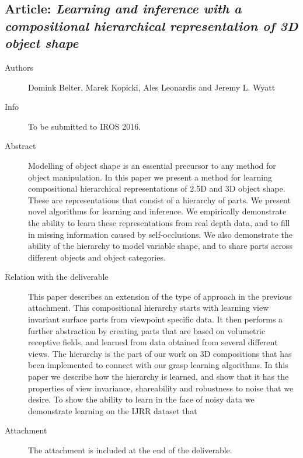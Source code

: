 \documentclass[a4paper,11pt,pdf]{../templates/pacmanreport}
\begin{document}
\subsection{Article: \em Learning and inference with a compositional hierarchical representation
of 3D object shape}
\begin{description}
    \item[Authors] Domink Belter, Marek Kopicki, Ales Leonardis and Jeremy L. Wyatt
    \item[Info] To be submitted to IROS 2016. %
    \item[Abstract] Modelling of object shape is an essential precursor to any method for object manipulation. In this paper
we present a method for learning compositional hierarchical representations of 2.5D and 3D object shape. These are representations
that consist of a hierarchy of parts. We present novel algorithms for learning and inference. We empirically demonstrate the ability to learn these representations from real
depth data, and to fill in missing information caused by self-occlusions. We also demonstrate the ability of the hierarchy to model variable shape, and to share parts across different
objects and object categories.
    \item [Relation with the deliverable] This paper describes an extension of the type of approach in the previous attachment. This compositional hierarchy starts with learning view invariant surface parts from viewpoint specific data. It then performs a further abstraction by creating parts that are based on volumetric receptive fields, and learned from data obtained from several different views. The hierarchy is the part of our work on 3D compositions that has been implemented to connect with our grasp learning algorithms. In this paper we describe how the hierarchy is learned, and show that it has the properties of view invariance, shareability and robustness to noise that we desire. To show the ability to learn in the face of noisy data we demonstrate learning on the IJRR dataset that 
    \item[Attachment] The attachment is included at the end of the deliverable. %
\end{description}
\newpage
\end{document}
